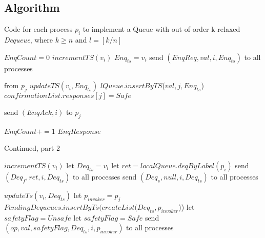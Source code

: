 \documentclass[a4paper,USenglish]{lipics-v2021} %
\begin{document}
\subsection{Algorithm}

\begin{algorithm}
  \caption{Code for each process $p_i$ to implement a Queue with out-of-order k-relaxed \textit{Dequeue}, where $k \geq n$ and $l = [k/n]$}
  \begin{algorithmic}[1]
      \State $EnqCount = 0$
      \State $incrementTS(v_i)$
      \State $Enq_{ts} = v_i$
      \State send $(EnqReq, val, i, Enq_{ts})$ to all processes
    \EndFunction

     from $p_j$
      \State $updateTS(v_i, Enq_{ts})$
      \State $lQueue.insertByTS$($val, j, Enq_{ts}$)
          \State $confirmationList.responses[j] = Safe$
        \EndIf
      \EndFor

      \State send $(EnqAck, i)$ to $p_j$
    \EndFunction

      \State $EnqCount += 1$
        \Return $EnqResponse$
      \EndIf
    \EndFunction

  \end{algorithmic}
\end{algorithm}

\begin{algorithm}
  \caption{Continued, part 2}
  \begin{algorithmic}[1]
      \State $incrementTS(v_i)$
      \State let $Deq_{ts} = v_i$
        \State let $ret = localQueue.deqByLabel(p_i)$
        \State send $(Deq_f, ret, i, Deq_{ts})$ to all processes
      \Else
        \State send $(Deq_s, null, i, Deq_{ts})$ to all processes
      \EndIf
    \EndFunction

      \State $updateTs(v_i, Deq_{ts})$
      \State let $p_{invoker} = p_j$
      \State $PendingDequeues.insertByTs(createList(Deq_{ts}, p_{invoker}$))
      \EndIf
        \State let $safetyFlag = Unsafe$
      \Else
        \State let $safetyFlag = Safe$
      \EndIf
      \State send $(op, val, safetyFlag, Deq_{ts}, i, p_{invoker})$ to all processes
    \EndFunction

  \end{algorithmic}
\end{algorithm}
\end{document}
